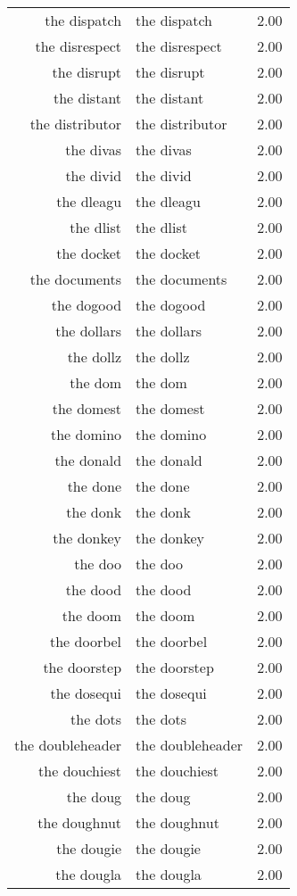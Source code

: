 \begin{table}[ht]
\begin{tabular}{rlr}
  the dispatch & the dispatch & 2.00 \\ 
  the disrespect & the disrespect & 2.00 \\ 
  the disrupt & the disrupt & 2.00 \\ 
  the distant & the distant & 2.00 \\ 
  the distributor & the distributor & 2.00 \\ 
  the divas & the divas & 2.00 \\ 
  the divid & the divid & 2.00 \\ 
  the dleagu & the dleagu & 2.00 \\ 
  the dlist & the dlist & 2.00 \\ 
  the docket & the docket & 2.00 \\ 
  the documents & the documents & 2.00 \\ 
  the dogood & the dogood & 2.00 \\ 
  the dollars & the dollars & 2.00 \\ 
  the dollz & the dollz & 2.00 \\ 
  the dom & the dom & 2.00 \\ 
  the domest & the domest & 2.00 \\ 
  the domino & the domino & 2.00 \\ 
  the donald & the donald & 2.00 \\ 
  the done & the done & 2.00 \\ 
  the donk & the donk & 2.00 \\ 
  the donkey & the donkey & 2.00 \\ 
  the doo & the doo & 2.00 \\ 
  the dood & the dood & 2.00 \\ 
  the doom & the doom & 2.00 \\ 
  the doorbel & the doorbel & 2.00 \\ 
  the doorstep & the doorstep & 2.00 \\ 
  the dosequi & the dosequi & 2.00 \\ 
  the dots & the dots & 2.00 \\ 
  the doubleheader & the doubleheader & 2.00 \\ 
  the douchiest & the douchiest & 2.00 \\ 
  the doug & the doug & 2.00 \\ 
  the doughnut & the doughnut & 2.00 \\ 
  the dougie & the dougie & 2.00 \\ 
  the dougla & the dougla & 2.00 \\ 

\end{tabular}
\end{table}
